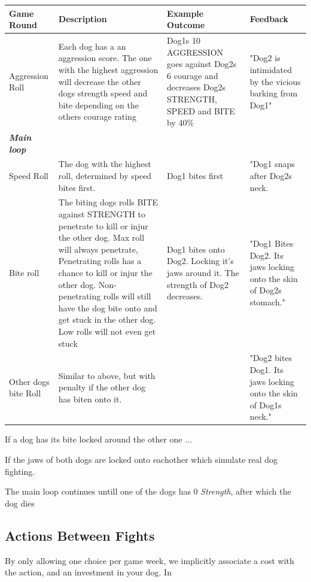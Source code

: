 \begin{center}
\scriptsize 
	\begin{tabular}{|l|p{5cm}|p{3cm}|p{3cm}|} 
		\hline
		\textbf{Game Round} & \textbf{Description} & \textbf{Example Outcome} &\textbf{ Feedback }\\ [0.5ex] 
		\hline\hline
		Aggression Roll & Each dog has a an aggression score. The one with the highest aggression will decrease the other dogs strength speed and bite depending on the others courage rating & Dog1s 10 AGGRESSION goes against Dog2s 6 courage and decreases Dog2s STRENGTH, SPEED and BITE by 40\% & "Dog2 is intimidated by the vicious barking from Dog1" \\  
		\hline\hline
		\textit{\textbf{Main loop}} \\
		\hline
		Speed Roll	& The dog with the highest roll, determined by speed bites first. &	Dog1 bites first & "Dog1 snaps after Dog2s neck. \\
		\hline
		Bite roll & The biting dogs rolls BITE against STRENGTH to penetrate to kill or injur the other dog. Max roll will always penetrate, Penetrating rolls has a chance to kill or injur the other dog. Non-penetrating rolls will still have the dog bite onto and get stuck in the other dog. Low rolls will not even get stuck & Dog1 bites onto Dog2. Locking it's jaws around it. The strength of Dog2 decreases.	& "Dog1 Bites Dog2. Its jaws locking onto the skin of Dog2s stomach." \\
		\hline
		Other dogs bite Roll & Similar to above, but with penalty if the other dog has biten onto it. & & "Dog2 bites Dog1. Its jaws locking onto the skin of Dog1s neck." \\
		\hline
	\end{tabular}
\end{center}


If a dog has its bite locked around the other one ...

If the jaws of both dogs are locked onto eachother
which simulate real dog fighting.

The main loop continues untill one of the dogs has 0 \textit{Strength}, after which the dog dies

\subsection{Actions Between Fights}
By only allowing one choice per game week, we implicitly associate a cost with the action, and an investment in your dog. In \cite{game:pokemon}

